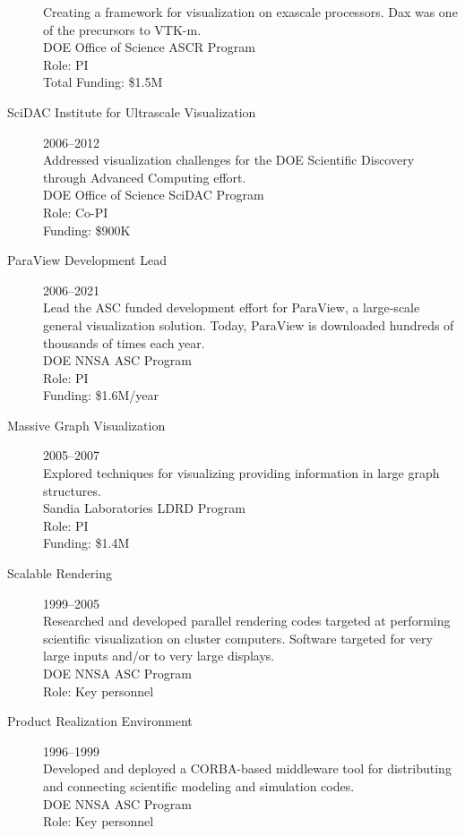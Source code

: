 \documentclass{article}
\begin{document}
\begin{description}
  Creating a framework for visualization on exascale processors. Dax was one of the precursors to \mbox{VTK-m}.\\
  DOE Office of Science ASCR Program\\
  Role: PI\\
  Total Funding: \$1.5M
\item[SciDAC Institute for Ultrascale Visualization]\hfill 2006--2012\\
  Addressed visualization challenges for the DOE Scientific Discovery through Advanced Computing effort.\\
  DOE Office of Science SciDAC Program\\
  Role: Co-PI\\
  Funding: \$900K
\item[ParaView Development Lead]\hfill 2006--2021\\
  Lead the ASC funded development effort for ParaView, a large-scale
  general visualization solution. Today, ParaView is downloaded hundreds of thousands of times each year.\\
  DOE NNSA ASC Program\\
  Role: PI\\
  Funding: \$1.6M/year %
\item[Massive Graph Visualization]\hfill 2005--2007 \\
  Explored techniques for visualizing providing information in large
  graph structures.\\
  Sandia Laboratories LDRD Program\\
  Role: PI\\
  Funding: \$1.4M
\item[Scalable Rendering]\hfill 1999--2005 \\
  Researched and developed parallel rendering codes targeted at performing scientific visualization on cluster computers.  Software targeted for very large inputs and/or to very large displays.\\
  DOE NNSA ASC Program\\
  Role: Key personnel
\item[Product Realization Environment]\hfill 1996--1999 \\
  Developed and deployed a CORBA-based middleware tool for distributing
  and connecting scientific modeling and simulation codes.\\
  DOE NNSA ASC Program\\
  Role: Key personnel
\end{description}
\end{document}

